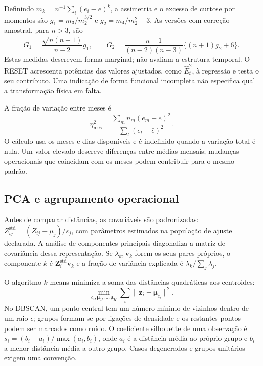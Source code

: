 Definindo $m_k=n^{-1}\sum_i(e_i-\bar e)^k$, a assimetria e o excesso de curtose por momentos são $g_1=m_3/m_2^{3/2}$ e $g_2=m_4/m_2^2-3$. As versões com correção amostral, para $n>3$, são
\begin{equation}
G_1=\frac{\sqrt{n(n-1)}}{n-2}g_1,
\qquad
G_2=\frac{n-1}{(n-2)(n-3)}\{(n+1)g_2+6\}.
\label{eq:mat-forma}
\end{equation}
Estas medidas descrevem forma marginal; não avaliam a estrutura temporal. O RESET acrescenta potências dos valores ajustados, como $\widehat E_t^2$, à regressão e testa o seu contributo. Uma indicação de forma funcional incompleta não especifica qual a transformação física em falta.

A fração de variação entre meses é
\begin{equation}
\eta^2_{\mathrm{mês}}=
\frac{\sum_m n_m(\bar e_m-\bar e)^2}{\sum_t(e_t-\bar e)^2}.
\label{eq:mat-eta}
\end{equation}
O cálculo usa os meses e dias disponíveis e é indefinido quando a variação total é nula. Um valor elevado descreve diferenças entre médias mensais; mudanças operacionais que coincidam com os meses podem contribuir para o mesmo padrão.

\subsection{PCA e agrupamento operacional}
\label{sec:mat-pca-clusters}
Antes de comparar distâncias, as covariáveis são padronizadas: $Z_{ij}^{\mathrm{std}}=(Z_{ij}-\mu_j)/s_j$, com parâmetros estimados na população de ajuste declarada. A análise de componentes principais diagonaliza a matriz de covariância dessa representação. Se $\lambda_k,\boldsymbol v_k$ forem os seus pares próprios, o componente $k$ é $\boldsymbol Z_i^{\mathrm{std}}\boldsymbol v_k$ e a fração de variância explicada é $\lambda_k/\sum_j\lambda_j$.

O algoritmo $k$-means minimiza a soma das distâncias quadráticas aos centroides:
\begin{equation}
\min_{c_i,\boldsymbol\mu_1,\ldots,\boldsymbol\mu_K}
\sum_i\|\boldsymbol z_i-\boldsymbol\mu_{c_i}\|^2.
\label{eq:mat-kmeans}
\end{equation}
No DBSCAN, um ponto central tem um número mínimo de vizinhos dentro de um raio $\epsilon$; grupos formam-se por ligações de densidade e os restantes pontos podem ser marcados como ruído. O coeficiente silhouette de uma observação é $s_i=(b_i-a_i)/\max(a_i,b_i)$, onde $a_i$ é a distância média ao próprio grupo e $b_i$ a menor distância média a outro grupo. Casos degenerados e grupos unitários exigem uma convenção.

